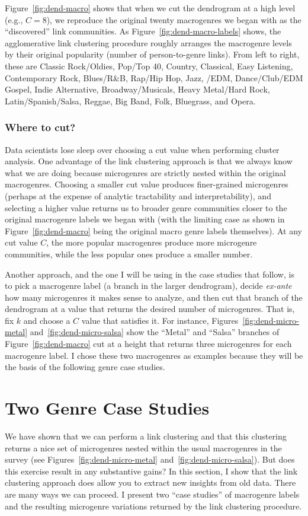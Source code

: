 \documentclass[a4paper,12pt]{extarticle}
\begin{document}
Figure~\ref{fig:dend-macro} shows that when we cut the dendrogram at a high level (e.g., $C = 8$), we reproduce the original twenty macrogenres we began with as the ``discovered'' link communities. As Figure~\ref{fig:dend-macro-labels} shows, the agglomerative link clustering procedure roughly arranges the macrogenre levels by their original popularity (number of person-to-genre links). From left to right, these are Classic Rock/Oldies, Pop/Top 40, Country, Classical, Easy Listening, Contemporary Rock, Blues/R\&B, Rap/Hip Hop, Jazz, /EDM, Dance/Club/EDM Gospel, Indie Alternative, Broadway/Musicals, Heavy Metal/Hard Rock, Latin/Spanish/Salsa, Reggae, Big Band, Folk, Bluegrass, and Opera. 

\subsubsection{Where to cut?}
Data scientists lose sleep over choosing a cut value when performing cluster analysis. One advantage of the link clustering approach is that we always know what we are doing because microgenres are strictly nested within the original macrogenres. Choosing a smaller cut value produces finer-grained microgenres (perhaps at the expense of analytic tractability and interpretability), and selecting a higher value returns us to broader genre communities closer to the original macrogenre labels we began with (with the limiting case as shown in Figure~\ref{fig:dend-macro} being the original macro genre labels themselves). At any cut value $C$, the more popular macrogenres produce more microgenre communities, while the less popular ones produce a smaller number. 

Another approach, and the one I will be using in the case studies that follow, is to pick a macrogenre label (a branch in the larger dendrogram), decide \textit{ex-ante} how many microgenres it makes sense to analyze, and then cut that branch of the dendrogram at a value that returns the desired number of microgenres. That is, fix $k$ and choose a $C$ value that satisfies it. For instance, Figures~\ref{fig:dend-micro-metal} and~\ref{fig:dend-micro-salsa} show the ``Metal'' and ``Salsa'' branches of Figure~\ref{fig:dend-macro} cut at a height that returns three microgenres for each macrogenre label. I chose these two macrogenres as examples because they will be the basis of the following genre case studies. 
 
\section{Two Genre Case Studies}
We have shown that we can perform a link clustering and that this clustering returns a nice set of microgenres nested within the usual macrogenres in the survey (see Figures~\ref{fig:dend-micro-metal} and~\ref{fig:dend-micro-salsa}). But does this exercise result in any substantive gains? In this section, I show that the link clustering approach does allow you to extract new insights from old data. There are many ways we can proceed. I present two ``case studies'' of macrogenre labels and the resulting microgenre variations returned by the link clustering procedure. 
\end{document}
